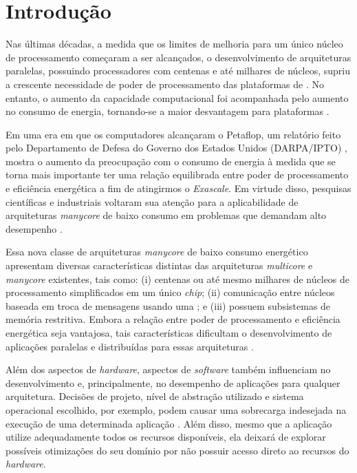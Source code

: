 \documentclass[
	12pt,				%
	openright,			%
	twoside,			%
	a4paper,			%
	english,			%
	brazil,				%
	]{abntex2}
\begin{document}
\chapter{Introdução}
\label{cap:introducao}

    Nas últimas décadas, a medida que os limites de melhoria para um único
    núcleo de processamento começaram a ser alcançados, o desenvolvimento
    de arquiteturas paralelas, possuindo processadores com centenas e até
    milhares de núcleos, supriu a crescente necessidade de poder de
    processamento das plataformas de \hpc.
    No entanto, o aumento da capacidade computacional foi acompanhada pelo
    aumento no consumo de energia, tornando-se a maior desvantagem para
    plataformas \hpc.
    
    Em uma era em que os computadores alcançaram o Petaflop, um relatório
    feito pelo Departamento de Defesa do Governo dos Estados Unidos
    (DARPA/IPTO) \cite{darpa:exascale}, mostra o aumento da preocupação
    com o consumo de energia à medida que se torna mais importante ter uma
    relação equilibrada entre poder de processamento e eficiência energética a fim de
    atingirmos o \textit{Exascale}. Em virtude disso, pesquisas científicas
    e industriais voltaram sua atenção para a aplicabilidade de arquiteturas
    \textit{manycore} de baixo consumo em problemas que demandam alto
    desempenho \cite{Castro-SBAC-PAD:2014, Castro-PARCO:2016}.
    
    Essa nova classe de arquiteturas \textit{manycore} de baixo consumo
    energético apresentam diversas características distintas das arquiteturas
    \textit{multicore} e \textit{manycore} existentes, tais como: 
    (i) centenas ou até mesmo milhares de núcleos de processamento
    simplificados em um único \textit{chip};
    (ii) comunicação entre núcleos baseada em troca de mensagens usando
    uma \noc; e 
    (iii) possuem subsistemas de memória restritiva.
    Embora a relação entre poder de processamento e eficiência energética
    seja vantajosa, tais características dificultam o desenvolvimento de aplicações
    paralelas e distribuídas para essas arquiteturas
     \cite{Castro-Souza-CCPE:2016, Castro-PARCO:2016, os:rmen}.
    
    Além dos aspectos de \textit{hardware}, aspectos de \textit{software} também influenciam
    no desenvolvimento e, principalmente, no desempenho de aplicações para
    qualquer arquitetura.
    Decisões de projeto, nível de abstração utilizado e sistema operacional
    escolhido, por exemplo, podem causar uma sobrecarga indesejada na execução
    de uma determinada aplicação \cite{Appel:1991:VMP:106972.106984, Cao:1994:IPA:1267638.1267651, Harty:1992:APM:143365.143511, Krueger:1993:TDA:165854.165867, Stonebraker:1981:OSS:358699.358703, Levy:Exception, hunt_singularity:_2007}.
    Além disso, mesmo que a aplicação utilize adequadamente todos os recursos
    disponíveis, ela deixará de explorar possíveis otimizações do seu
    domínio por não possuir acesso direto ao recursos do \textit{hardware}.
    
\end{document}
